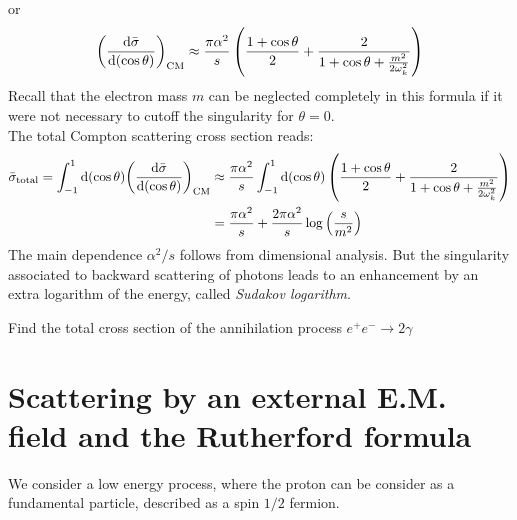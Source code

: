 \documentclass[TheoreticalPhy_ModB.tex]{subfiles}
\begin{document}
or
\[{\left(\frac{\textup{d}\bar\sigma}{\textup{d}(\cos\theta)}\right)}_{\textup{CM}}
\approx\frac{\pi\alpha^2}{s}\left(\frac{1+\cos\theta}{2}+\frac{2}{1+\cos\theta+\frac{m^2}{2\omega_k^2}}\right)\]
Recall that the electron mass $m$ can be neglected completely in this formula if it were not necessary to cutoff the singularity for $\theta=0$.\\
The total Compton scattering cross section reads:
\begin{align*}
\bar\sigma_{\textup{total}}=\int_{-1}^1\textup{d}(\cos\theta){\left(\frac{\textup{d}\bar\sigma}{\textup{d}(\cos\theta)}\right)}_{\textup{CM}}
&\approx 
\frac{\pi\alpha^2}{s}\int_{-1}^1\textup{d}(\cos\theta)\left(\frac{1+\cos\theta}{2}+\frac{2}{1+\cos\theta+\frac{m^2}{2\omega_k^2}}\right)\\
&=\frac{\pi\alpha^2}{s}+\frac{2\pi\alpha^2}{s}\log\left(\frac s{m^2}\right)
\end{align*}
The main dependence $\alpha^2/s$ follows from dimensional analysis. But the singularity associated to backward scattering of photons leads to an enhancement by an extra logarithm of the energy, called \emph{Sudakov logarithm}.

\begin{example}
Find the total cross section of the annihilation process $e^+e^-\rightarrow2\gamma$
\end{example}


\section{Scattering by an external E.M. field and the Rutherford formula}

{\small We consider a low energy process, where the proton can be consider as a fundamental particle, described as a spin $1/2$ fermion.}
\end{document}
